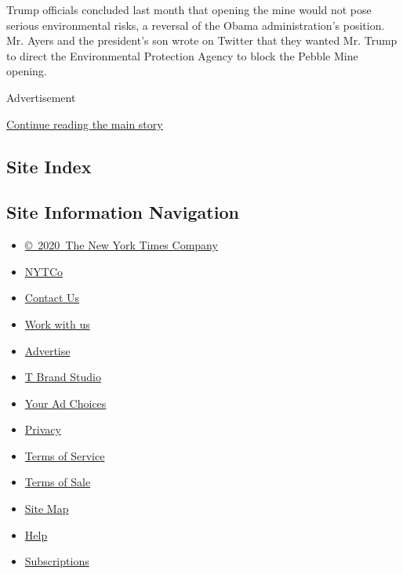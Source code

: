 Trump officials concluded last month that opening the mine would not
pose serious environmental risks, a reversal of the Obama
administration's position. Mr. Ayers and the president's son wrote on
Twitter that they wanted Mr. Trump to direct the Environmental
Protection Agency to block the Pebble Mine opening.

Advertisement

\protect\hyperlink{after-bottom}{Continue reading the main story}

\hypertarget{site-index}{%
\subsection{Site Index}\label{site-index}}

\hypertarget{site-information-navigation}{%
\subsection{Site Information
Navigation}\label{site-information-navigation}}

\begin{itemize}
\tightlist
\item
  \href{https://help.nytimes3xbfgragh.onion/hc/en-us/articles/115014792127-Copyright-notice}{©~2020~The
  New York Times Company}
\end{itemize}

\begin{itemize}
\tightlist
\item
  \href{https://www.nytco.com/}{NYTCo}
\item
  \href{https://help.nytimes3xbfgragh.onion/hc/en-us/articles/115015385887-Contact-Us}{Contact
  Us}
\item
  \href{https://www.nytco.com/careers/}{Work with us}
\item
  \href{https://nytmediakit.com/}{Advertise}
\item
  \href{http://www.tbrandstudio.com/}{T Brand Studio}
\item
  \href{https://www.nytimes3xbfgragh.onion/privacy/cookie-policy\#how-do-i-manage-trackers}{Your
  Ad Choices}
\item
  \href{https://www.nytimes3xbfgragh.onion/privacy}{Privacy}
\item
  \href{https://help.nytimes3xbfgragh.onion/hc/en-us/articles/115014893428-Terms-of-service}{Terms
  of Service}
\item
  \href{https://help.nytimes3xbfgragh.onion/hc/en-us/articles/115014893968-Terms-of-sale}{Terms
  of Sale}
\item
  \href{https://spiderbites.nytimes3xbfgragh.onion}{Site Map}
\item
  \href{https://help.nytimes3xbfgragh.onion/hc/en-us}{Help}
\item
  \href{https://www.nytimes3xbfgragh.onion/subscription?campaignId=37WXW}{Subscriptions}
\end{itemize}

